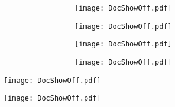 \documentclass[c]{beamer}  %
\begin{document}
	
	\begin{frame}
		\frametitle{\insertsection}
		\framesubtitle{\insertsubsection}
		\begin{center}
			\begin{figure}
				\begin{subfigure}{0.5\textwidth}
					
					\begin{subfigure}[t]{\textwidth}
						\texttt{[image: DocShowOff.pdf]}	
					\end{subfigure}
					
					
					\begin{subfigure}[b]{\textwidth}
						\texttt{[image: DocShowOff.pdf]}
					\end{subfigure}
					
				\end{subfigure}%
				\begin{subfigure}{0.5\textwidth}
					\begin{subfigure}[t]{\textwidth}
						\texttt{[image: DocShowOff.pdf]}
					\end{subfigure}
					
					
					\begin{subfigure}[b]{\textwidth}
						\texttt{[image: DocShowOff.pdf]}
					\end{subfigure}
				\end{subfigure}	
			\end{figure}
		\end{center}
	\end{frame}

	\begin{frame}[plain]
		\centering
		\hspace*{-0.1\textwidth}%
		\texttt{[image: DocShowOff.pdf]}
	\end{frame}

	\begin{frame}[plain]
		\centering
		\hspace*{-0.1\textwidth}%
		\texttt{[image: DocShowOff.pdf]}
	\end{frame}
\end{document}
